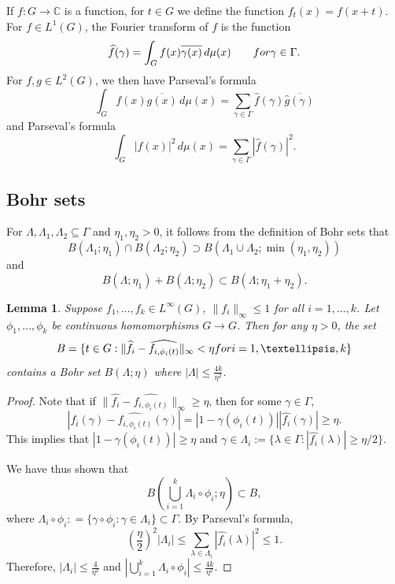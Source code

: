 \documentclass[10pt]{article}
\newtheorem{lemma}[lemma]{Lemma}
\theoremstyle{definition}
\newcommand{\C}{\mathbb{C}}
\begin{document}
If $f: G \rightarrow \C$ is a function, for $t \in G$ we define the function $f_t(x) = f(x+t)$. 
For $f \in L^1(G)$, the Fourier transform of $f$ is the function
\[
\widehat{f} (\gamma) = \int_{G} f(x) \overline{\gamma (x)} \, d\mu(x) \qquad \textup{ for } \gamma \in \Gamma.
\]
For $f, g \in L^2(G)$, we then have Parseval's formula
\[
\int_{G} f(x) \overline{g(x)} \, d\mu(x) = \sum_{\gamma \in \Gamma} \widehat{f} (\gamma) \overline{ \widehat{g} (\gamma) }
\]
and Parseval's formula
\[
\int_{G} |f(x)|^2 \, d\mu(x) = \sum_{\gamma \in \Gamma} \left| \widehat{f} (\gamma) \right|^2.
\]


\subsection{Bohr sets} 
For $\Lambda, \Lambda_1, \Lambda_2 \subseteq \Gamma$ and $\eta_1, \eta_2 > 0$, it follows from the definition of Bohr sets that 
\[
    B(\Lambda_1; \eta_1) \cap B(\Lambda_2; \eta_2) \supset B(\Lambda_1 \cup \Lambda_2; \min(\eta_1, \eta_2))
\]
and
\[
    B(\Lambda; \eta_1) + B(\Lambda; \eta_2) \subset B(\Lambda; \eta_1 + \eta_2).
\]

\begin{lemma} \label{lem:translate}
Suppose $f_1, \ldots, f_k \in L^\infty(G)$, $\| f_i \|_{\infty} \leq 1$ for all $i=1, \ldots, k$. Let $\phi_1, \ldots, \phi_k$ be continuous homomorphisms $G \rightarrow G$. Then for any $\eta >0$, the set
\[
B = \{ t \in G: \| \widehat{f_i} - \widehat{f_{i, \phi_i(t)}} \|_{\infty} < \eta \textup{ for }i=1, \ldots, k \}
\]
contains a Bohr set $B(\Lambda; \eta)$ where $|\Lambda| \leq \frac{4k}{\eta^2}$.
\end{lemma}
\begin{proof}
Note that if $\| \widehat{f_i} - \widehat{f_{i, \phi_i(t)}} \|_\infty \geq \eta$, then for some $\gamma \in \Gamma$, 
\[
|\widehat{f_i}(\gamma) - \widehat{f_{i, \phi_i(t)}}(\gamma)| = |1 - \gamma(\phi_i(t))| |\widehat{f_i}(\gamma)| \geq \eta.
\]
This implies that $|1 - \gamma(\phi_i(t))| \geq \eta$ and $\gamma \in \Lambda_i := \{ \lambda \in \Gamma : |\widehat{f_i}(\lambda)| \geq \eta /2 \}$.

We have thus shown that 
\[
  B( \bigcup_{i=1}^k \Lambda_i \circ \phi_i; \eta) \subset B,  
\]
where $\Lambda_i \circ \phi_i: = \{ \gamma \circ \phi_i: \gamma \in \Lambda_i\} \subset \Gamma$. By  Parseval's formula, 
\[
\left( \frac{\eta}{2} \right)^2 |\Lambda_i| \leq \sum_{\lambda \in \Lambda_i} \left|\widehat{f_i}(\lambda)\right|^2 \leq 1.
\]
Therefore, $|\Lambda_i| \leq \frac{4}{\eta^2}$ and $|\bigcup_{i=1}^k \Lambda_i \circ \phi_i| \leq \frac{4k}{\eta^2}$.
\end{proof}
\end{document}
